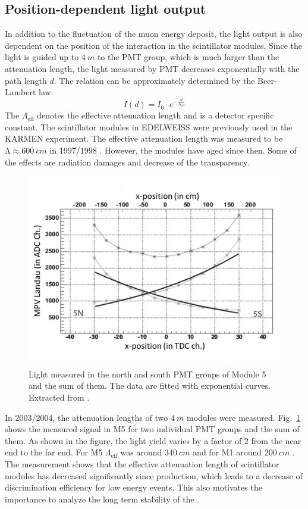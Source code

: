 \subsection{Position-dependent light output}
In addition to the fluctuation of the muon energy deposit, the light output is also dependent on the position of the interaction in the scintillator modules. Since the light is guided up to $\SI{4}{m}$ to the PMT group, which is much larger than the attenuation length, the light measured by PMT decreases exponentially with the path length $d$. The relation can be approximately determined by the Beer-Lambert law:
\begin{equation}
  I(d)=I_{0}\cdot e^{-\frac{d}{\mathrm{\Lambda}_{\mathrm{eff}}}}
\end{equation}
The $\Lambda_{\mathrm{eff}}$ denotes the effective attenuation length and is a detector specific constant.
The scintillator modules in EDELWEISS were previously used in the KARMEN experiment. The effective attenuation length was measured to be $\mathrm{\Lambda} \approx \SI{600}{cm}$ in 1997/1998 \cite{Rei98}. However, the modules have aged since then. Some of the effects are radiation damages and decrease of the transparency.

\begin{figure}[ht!]
  \centering
  \includegraphics[width=0.6\textwidth{}]{./fig/pos-dependent.png}
  \caption{Light measured in the north and south PMT groups of Module 5 and the sum of them. The data are fitted with exponential curves. Extracted from \cite{Hab04}.}
  \label{fig:pos-dependent}
\end{figure}

In 2003/2004, the attenuation lengths of two $\SI{4}{m}$ modules were measured. Fig.\ \ref{fig:pos-dependent} shows the measured signal in M5 for two individual PMT groups and the sum of them. As shown in the figure, the light yield varies by a factor of 2 from the near end to the far end.
For M5 $\Lambda_{\mathrm{eff}}$ was around $\SI{340}{cm}$ and for M1 around $\SI{200}{cm}$ \cite{Hab04}. The measurement shows that the effective attenuation length of scintillator modules has decreased significantly since production, which leads to a decrease of discrimination efficiency for low energy events. This also motivates the importance to analyze the long term stability of the \mvs{}.


